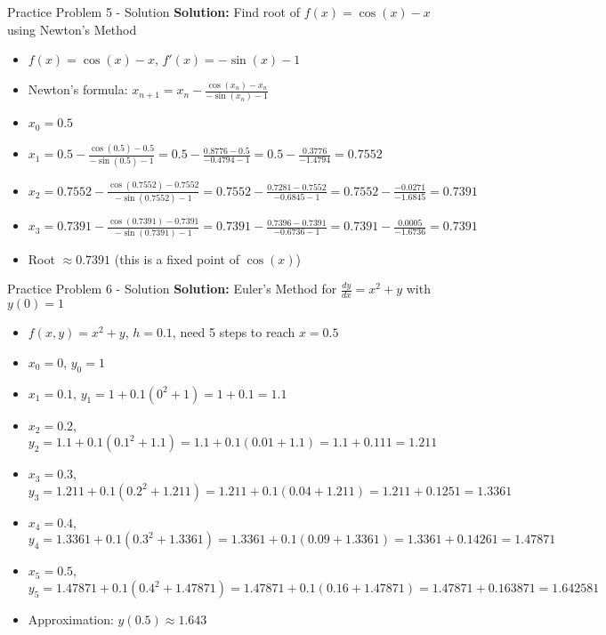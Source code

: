 \documentclass[aspectratio=169]{beamer}
\begin{document}
\begin{frame}{Practice Problem 5 - Solution}
\textbf{Solution:} Find root of $f(x) = \cos(x) - x$ using Newton's Method

\begin{itemize}
    \item $f(x) = \cos(x) - x$, $f'(x) = -\sin(x) - 1$
    \item Newton's formula: $x_{n+1} = x_n - \frac{\cos(x_n) - x_n}{-\sin(x_n) - 1}$
    \item $x_0 = 0.5$
    \item $x_1 = 0.5 - \frac{\cos(0.5) - 0.5}{-\sin(0.5) - 1} = 0.5 - \frac{0.8776 - 0.5}{-0.4794 - 1} = 0.5 - \frac{0.3776}{-1.4794} = 0.7552$
    \item $x_2 = 0.7552 - \frac{\cos(0.7552) - 0.7552}{-\sin(0.7552) - 1} = 0.7552 - \frac{0.7281 - 0.7552}{-0.6845 - 1} = 0.7552 - \frac{-0.0271}{-1.6845} = 0.7391$
    \item $x_3 = 0.7391 - \frac{\cos(0.7391) - 0.7391}{-\sin(0.7391) - 1} = 0.7391 - \frac{0.7396 - 0.7391}{-0.6736 - 1} = 0.7391 - \frac{0.0005}{-1.6736} = 0.7391$
    \item Root $\approx 0.7391$ (this is a fixed point of $\cos(x)$)
\end{itemize}
\end{frame}

\begin{frame}{Practice Problem 6 - Solution}
\textbf{Solution:} Euler's Method for $\frac{dy}{dx} = x^2 + y$ with $y(0) = 1$

\begin{itemize}
    \item $f(x,y) = x^2 + y$, $h = 0.1$, need 5 steps to reach $x = 0.5$
    \item $x_0 = 0$, $y_0 = 1$
    \item $x_1 = 0.1$, $y_1 = 1 + 0.1(0^2 + 1) = 1 + 0.1 = 1.1$
    \item $x_2 = 0.2$, $y_2 = 1.1 + 0.1(0.1^2 + 1.1) = 1.1 + 0.1(0.01 + 1.1) = 1.1 + 0.111 = 1.211$
    \item $x_3 = 0.3$, $y_3 = 1.211 + 0.1(0.2^2 + 1.211) = 1.211 + 0.1(0.04 + 1.211) = 1.211 + 0.1251 = 1.3361$
    \item $x_4 = 0.4$, $y_4 = 1.3361 + 0.1(0.3^2 + 1.3361) = 1.3361 + 0.1(0.09 + 1.3361) = 1.3361 + 0.14261 = 1.47871$
    \item $x_5 = 0.5$, $y_5 = 1.47871 + 0.1(0.4^2 + 1.47871) = 1.47871 + 0.1(0.16 + 1.47871) = 1.47871 + 0.163871 = 1.642581$
    \item Approximation: $y(0.5) \approx 1.643$
\end{itemize}
\end{frame}
\end{document}
